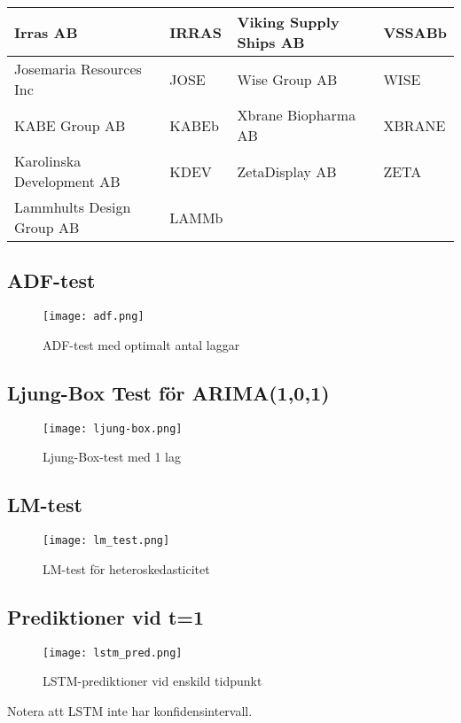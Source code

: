 \documentclass[11pt]{article}
\numberwithin{equation}{section}
\numberwithin{table}{section}
\numberwithin{figure}{section}
\begin{document}
\begin{table}[H]
{\begin{tabular}{|l|l|l|l|}
\rowcolor[HTML]{EFEFEF} 
Irras AB & IRRAS & Viking Supply Ships AB & VSSABb \\ \hline
Josemaria Resources Inc & JOSE & Wise Group AB & WISE \\ \hline
\rowcolor[HTML]{EFEFEF} 
KABE Group AB & KABEb & Xbrane Biopharma AB & XBRANE \\ \hline
Karolinska Development AB & KDEV & ZetaDisplay AB & ZETA \\ \hline
\rowcolor[HTML]{EFEFEF} 
Lammhults Design Group AB & LAMMb & \multicolumn{2}{l|}{\cellcolor[HTML]{EFEFEF}} \\ \hline
\end{tabular}}
\end{table}

\subsection{ADF-test}
\begin{figure}[H]
\caption{ADF-test med optimalt antal laggar}
\texttt{[image: adf.png]}
\centering
\end{figure}

\subsection{Ljung-Box Test för ARIMA(1,0,1)}
\begin{figure}[H]
\caption{Ljung-Box-test med 1 lag}
\texttt{[image: ljung-box.png]}
\centering
\end{figure}

\subsection{LM-test}
\begin{figure}[H]
\caption{LM-test för heteroskedasticitet}
\texttt{[image: lm\_test.png]}
\centering
\end{figure}

\subsection{Prediktioner vid t=1}
\begin{figure}[H]
\caption{LSTM-prediktioner vid enskild tidpunkt}
\texttt{[image: lstm\_pred.png]}
\centering
\end{figure}
Notera att LSTM inte har konfidensintervall.
\end{document}
